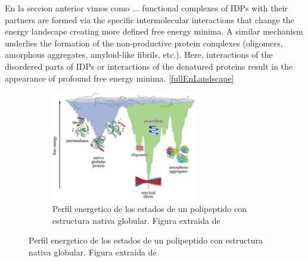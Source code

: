 En la seccion anterior vimos como ... functional complexes of IDPs with their partners are formed via the specific intermolecular interactions that change the energy landscape creating more defined free energy minima.
A similar mechanism underlies the formation of the non-productive protein complexes (oligomers, amorphous aggregates, amyloid-like fibrils, etc.). 
Here, interactions of the disordered parts of IDPs or interactions of the denatured proteins result in the appearance of profound free energy minima. \ref{fullEnLandscape}


\begin{figure}[htbp]
\centering
\begin{subfigure}[b]{\linewidth}
\includegraphics[width=0.7\textwidth]{img/globularEnLandscape.png} 
\centering
\caption{Perfil energetico de los estados de un polipeptido con estructura nativa globular. Figura extraida de \cite{turoverov2010protein}}
\label{globularFullEnLandscape}
\end{subfigure}


\end{figure}
